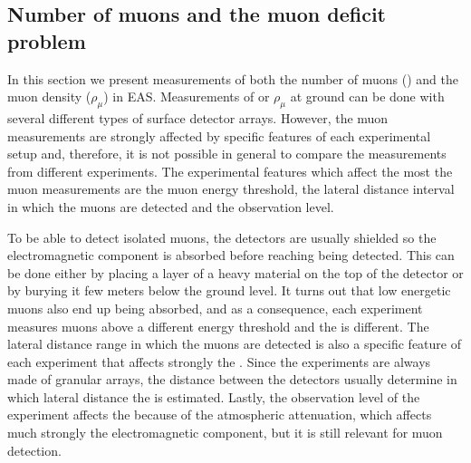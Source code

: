 \subsection{Number of muons and the muon deficit problem}
\label{sec:shower:observables:nmu}

In this section we present measurements of both the number of muons (\nmu)
and the muon density ($\rho_\mu$) in EAS.
Measurements of \nmu or $\rho_\mu$ at ground can
be done with several different types of surface detector arrays.
However, the muon measurements are strongly affected by specific features
of each experimental setup and, therefore, it is not possible in general
to compare the measurements from different experiments. The experimental features
which affect the most the muon measurements are the muon energy threshold,
the lateral distance interval in which the muons are detected and the observation
level. 

To be able to detect isolated muons, the detectors are usually shielded so the
electromagnetic component is absorbed before reaching being detected. This can
be done either by placing a layer of a heavy material on the top of the detector
or by burying it few meters below the ground level. It turns out that low energetic muons
also end up being absorbed, and as a consequence, each experiment measures
muons above a different energy threshold and the \nmu is different.
The lateral distance range in which the muons are detected is also
a specific feature of each experiment that affects strongly the \nmu. Since
the experiments are always made of granular arrays, the distance between the detectors
usually determine in which lateral distance the \nmu is estimated. Lastly,
the observation level of the experiment affects the \nmu because of the atmospheric attenuation,
which affects much strongly the electromagnetic component, but it is still relevant for
muon detection.

